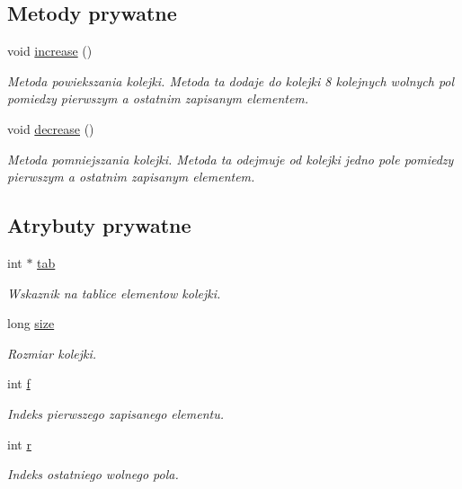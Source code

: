\subsection*{Metody prywatne}
\begin{DoxyCompactItemize}
\item 
void \hyperlink{class_kolejka_ab4f51f0ec7fef36a85af6cfd1c257427}{increase} ()
\begin{DoxyCompactList}\small\item\em Metoda powiekszania kolejki. Metoda ta dodaje do kolejki 8 kolejnych wolnych pol pomiedzy pierwszym a ostatnim zapisanym elementem. \end{DoxyCompactList}\item 
void \hyperlink{class_kolejka_ac5e2b2debef36e939ebc7532f8006e20}{decrease} ()
\begin{DoxyCompactList}\small\item\em Metoda pomniejszania kolejki. Metoda ta odejmuje od kolejki jedno pole pomiedzy pierwszym a ostatnim zapisanym elementem. \end{DoxyCompactList}\end{DoxyCompactItemize}
\subsection*{Atrybuty prywatne}
\begin{DoxyCompactItemize}
\item 
int $\ast$ \hyperlink{class_kolejka_a49e444e7bd7b91a78bc2a46426b73128}{tab}
\begin{DoxyCompactList}\small\item\em Wskaznik na tablice elementow kolejki. \end{DoxyCompactList}\item 
long \hyperlink{class_kolejka_a84898848de8e77a76a6f2e4a7393b4bb}{size}
\begin{DoxyCompactList}\small\item\em Rozmiar kolejki. \end{DoxyCompactList}\item 
int \hyperlink{class_kolejka_ae66597dc9eb1fcc210b075f8aa7ff77f}{f}
\begin{DoxyCompactList}\small\item\em Indeks pierwszego zapisanego elementu. \end{DoxyCompactList}\item 
int \hyperlink{class_kolejka_ae16213a5b751800eb48da6bede435ad0}{r}
\begin{DoxyCompactList}\small\item\em Indeks ostatniego wolnego pola. \end{DoxyCompactList}\end{DoxyCompactItemize}


